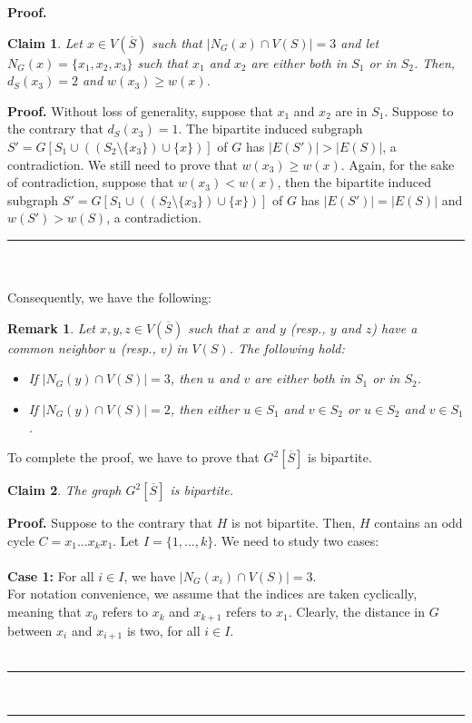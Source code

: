 \documentclass[12pt, oneside]{scrartcl}
\newtheorem{remark}{Remark}%
\newtheorem{claim}{Claim}[theorem]
\newenvironment{proof}[1][Proof]{\textbf{#1.} }{\ \rule{0.5em}{0.5em}}
\begin{document}
\begin{proof}
\begin{claim}\label{Claim3}
Let $x\in V(\overline{S})$ such that $|N_G(x)\cap V(S)|=3$ and let $N_G(x)=\{x_1,x_2,x_3\}$ such that $x_1$ and $x_2$ are either both in $S_1$ or in $S_2$. Then, $d_S(x_3)=2$ and $w(x_3)\geq w(x)$.
\end{claim}
\begin{proof}
Without loss of generality, suppose that $x_1$ and $x_2$ are in $S_1$. Suppose to the contrary that $d_S(x_3)=1$. The bipartite induced subgraph $S'=G[S_1 \cup ((S_2\setminus \{x_3\})\cup \{x\})]$ of $G$ has $|E(S')|>|E(S)|$, a contradiction. We still need to prove that $w(x_3)\geq w(x)$. Again, for the sake of contradiction, suppose that $w(x_3)<w(x)$, then the bipartite induced subgraph $S'=G[S_1 \cup ((S_2\setminus \{x_3\})\cup \{x\})]$ of $G$ has $|E(S')|=|E(S)|$ and $w(S')>w(S)$, a contradiction.
\end{proof}\\
\\
Consequently, we have the following:
\begin{remark}\label{remark1}
Let $x,y,z\in V(\overline{S})$ such that $x$ and $y$ (resp., $y$ and $z$) have a common neighbor $u$ (resp., $v$) in $V(S)$. The following hold: \begin{itemize}
    \item[(i)] If $|N_G(y)\cap V(S)|=3$, then $u$ and $v$ are either both in $S_1$ or in $S_2$.
    \item[(ii)] If $|N_G(y)\cap V(S)|=2$, then either $u\in S_1$ and $v\in S_2$ or $u\in S_2$ and $v\in S_1$. 
\end{itemize}
\end{remark}
To complete the proof, we have to prove that $G^2[\overline{S}]$ is bipartite.
\begin{claim}\label{Claim4}
The graph $G^2[\overline{S}]$ is bipartite.
\end{claim}
\begin{proof}
Suppose to the contrary that $H$ is not bipartite. Then, $H$ contains an odd cycle $C=x_1\dots x_kx_1$. Let $I=\{1,\dots ,k\}$. We need to study two cases:\\
\\
\textbf{Case 1:} For all $i\in I$, we have $|N_G(x_i)\cap V(S)|=3$.\\
For notation convenience, we assume that the indices are taken cyclically, meaning that $x_0$ refers to $x_k$ and $x_{k+1}$ refers to $x_1$. Clearly, the distance in $G$ between $x_i$ and $x_{i+1}$ is two, for all $i\in I$.\\

\end{proof}
\end{proof}
\end{document}
